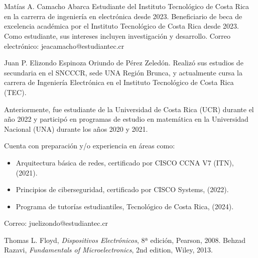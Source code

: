 \documentclass[journal]{IEEEtran}
\begin{document}
\section{}

\begin{IEEEbiographynophoto}{Matías A. Camacho Abarca}
        Estudiante del Instituto Tecnológico de Costa Rica en la carrerra de ingeniería en electrónica desde
        2023. Beneficiario de beca de excelencia académica por el Instituto Tecnológico de
        Costa Rica desde 2023. Como estudiante, sus
        intereses incluyen investigación y desarrollo.
        Correo electrónico: jeacamacho@estudiantec.cr
\end{IEEEbiographynophoto}

\begin{IEEEbiographynophoto}{Juan P. Elizondo Espinoza}
        Oriundo de Pérez Zeledón. Realizó sus estudios de secundaria en el SNCCCR, sede UNA Región Brunca, y actualmente cursa la carrera de Ingeniería Electrónica en el Instituto Tecnológico de Costa Rica (TEC). 
        
        Anteriormente, fue estudiante de la Universidad de Costa Rica (UCR) durante el año 2022 y participó en programas de estudio en matemática en la Universidad Nacional (UNA) durante los años 2020 y 2021. 
        
        Cuenta con preparación y/o experiencia en áreas como:
        \begin{itemize}
            \item Arquitectura básica de redes, certificado por CISCO CCNA V7 (ITN), (2021).
            \item Principios de ciberseguridad, certificado por CISCO Systems, (2022).
            \item Programa de tutorías estudiantiles, Tecnológico de Costa Rica, (2024).
        \end{itemize}
        
        Correo: juelizondo@estudiantec.cr
\end{IEEEbiographynophoto}


\begin{thebibliography}{11}
    Thomas L. Floyd, \emph{Dispositivos Electrónicos}, 8ª edición, Pearson, 2008.
    Behzad Razavi, \emph{Fundamentals of Microelectronics}, 2nd edition, Wiley, 2013.

\end{thebibliography}
\end{document}
